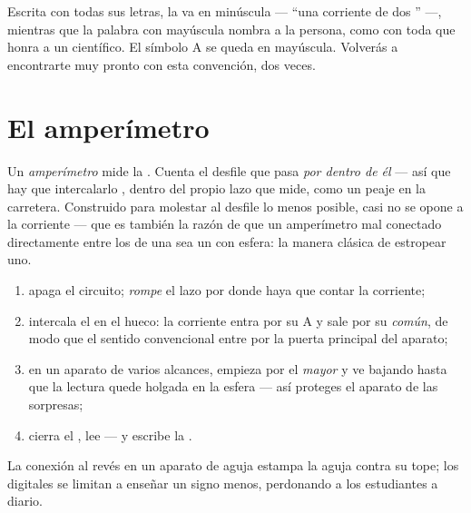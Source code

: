 \begin{remark}\label{rem:g8:intensity-ammeter:person}
Escrita con todas sus letras, la  va en minúscula --- ``una
corriente de dos '' ---, mientras que la palabra con
mayúscula nombra a la persona, como con toda  que honra a un
científico. El símbolo \unit{A} se queda en mayúscula. Volverás a
encontrarte muy pronto con esta convención, dos veces.
\end{remark}

\section{El amperímetro}

\begin{definition}[Amperímetro]\label{def:g8:intensity-ammeter:ammeter}
Un \emph{amperímetro} mide la
. Cuenta el desfile que pasa \emph{por dentro de él}
--- así que hay que intercalarlo \emph{}, dentro del propio
lazo que mide, como un peaje en la carretera. Construido para
molestar al desfile lo menos posible, casi no se opone a la corriente
--- que es también la razón de que un amperímetro mal conectado
directamente entre los  de una  sea un
 con esfera: la manera clásica de estropear uno.
\end{definition}

\begin{method}\label{met:g8:intensity-ammeter:measure}
\begin{enumerate}
  \item apaga el circuito; \emph{rompe} el lazo por donde haya que
        contar la corriente;
  \item intercala el  en el hueco: la corriente entra
        por su  \unit{A} y sale por su 
        \emph{común}, de modo que el sentido convencional entre por
        la puerta principal del aparato;
  \item en un aparato de varios alcances, empieza por el
        \emph{mayor} y ve bajando hasta que la lectura quede holgada
        en la esfera --- así proteges el aparato de las sorpresas;
  \item cierra el , lee --- y escribe la
        .
\end{enumerate}
La conexión al revés en un aparato de aguja estampa la aguja contra su
tope; los digitales se limitan a enseñar un signo menos, perdonando a
los estudiantes a diario.
\end{method}

